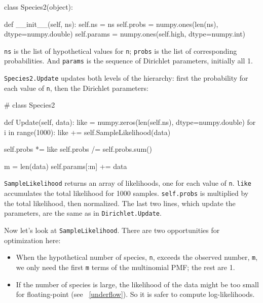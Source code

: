 \documentclass[12pt]{book}
\theoremstyle{exercise}
\newcommand{\py}[1]{{\tt #1}}%
\begin{document}
\begin{code}
class Species2(object):

    def __init__(self, ns):
        self.ns = ns
        self.probs = numpy.ones(len(ns), dtype=numpy.double)
        self.params = numpy.ones(self.high, dtype=numpy.int)
\end{code}

\py{ns} is the list of hypothetical values for \py{n};
\py{probs} is the list of corresponding probabilities.  And
\py{params} is the sequence of Dirichlet parameters, initially
all 1.

\py{Species2.Update} updates both levels of
the hierarchy: first the probability for each value of \py{n},
then the Dirichlet parameters:

\begin{code}
# class Species2

    def Update(self, data):
        like = numpy.zeros(len(self.ns), dtype=numpy.double)
        for i in range(1000):
            like += self.SampleLikelihood(data)

        self.probs *= like
        self.probs /= self.probs.sum()

        m = len(data)
        self.params[:m] += data
\end{code}

\py{SampleLikelihood} returns an array of likelihoods, one for each
value of \py{n}.  \py{like} accumulates the total likelihood for
1000 samples.  \py{self.probs} is multiplied by the total likelihood,
then normalized.  The last two lines, which update the parameters,
are the same as in \py{Dirichlet.Update}.

Now let's look at \py{SampleLikelihood}.  There are two
opportunities for optimization here:

\begin{itemize}

\item When the hypothetical number of species, \py{n},
exceeds the observed number, \py{m}, we only need the first \py{m}
terms of the multinomial PMF; the rest are 1.

\item If the number of species is large, the likelihood of the data
  might be too small for floating-point (see ~\ref{underflow}).  So it
  is safer to compute log-likelihoods.
   

\end{itemize}
\end{document}
